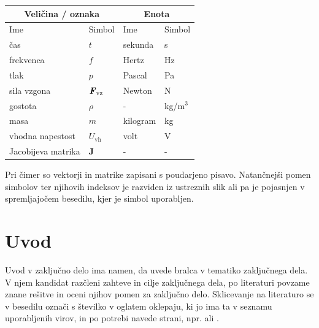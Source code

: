 \documentclass[a4paper,twoside,openright,12pt,slovene]{book}
\begin{document}
\begin{center}
    \begin{tabular}{*{4}{l}} \hline
        \multicolumn{2}{c}{\bf{Veličina / oznaka}}           & \multicolumn{2}{c}{\bf{Enota}} \\ \hline
        Ime                & Simbol                          & Ime      & Simbol              \\ \hline
        čas                & $t$                             & sekunda  & s                   \\
        frekvenca          & $f$                             & Hertz    & Hz                  \\
        tlak               & $p$                             & Pascal   & Pa                  \\
        sila vzgona        & $\textbf{\textit{F}}_\text{vz}$ & Newton   & N                   \\
        gostota            & $\rho$                          & -        & kg/m$^3$            \\
        masa               & $m$                             & kilogram & kg                  \\
        vhodna napestost   & $U_\text{vh}$                   & volt     & V                   \\
        Jacobijeva matrika & $\mathbf{J}$                    & -        & -                   \\ \hline
    \end{tabular}
\end{center}

Pri čimer so vektorji in matrike zapisani s poudarjeno pisavo. Natančnejši pomen simbolov ter njihovih indeksov je razviden iz ustreznih slik ali pa je pojasnjen v spremljajočem besedilu, kjer je simbol uporabljen.

\mainmatter

\chapter{Uvod} \label{uvod}

Uvod v zaključno delo ima namen, da uvede bralca v tematiko zaključnega dela. V njem kandidat razčleni zahteve in cilje zaključnega dela, po literaturi povzame znane rešitve in oceni njihov pomen za zaključno delo. Sklicevanje na literaturo se v besedilu označi s številko v oglatem oklepaju, ki jo ima ta v seznamu uporabljenih virov, in po potrebi navede strani, npr. \cite{miklavcic2010objavljanje} ali \cite[stran 520-534]{juznic1992diplomska}.
\end{document}
